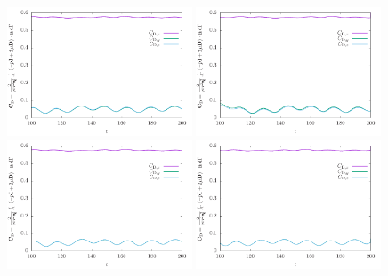 \documentclass[11pt, a4paper]{article}
\theoremstyle{remark}
\begin{document}
\begin{figure}
  \centering
  \includegraphics[width=0.49\textwidth]{./results/flow_past_sphere_smoke/optimized_run_reused_solvers_bcgs_and_pcsor/grid_update_1/force_history.pdf} 
  \includegraphics[width=0.49\textwidth]{./results/flow_past_sphere_smoke/optimized_run_reused_solvers_bcgs_and_pcsor/grid_update_2/force_history.pdf} \\
  \includegraphics[width=0.49\textwidth]{./results/flow_past_sphere_smoke/optimized_run_reused_solvers_bcgs_and_pcsor/grid_update_4/force_history.pdf}
  \includegraphics[width=0.49\textwidth]{./results/flow_past_sphere_smoke/optimized_run_reused_solvers_bcgs_and_pcsor/grid_update_8/force_history.pdf} \\

\end{figure}
\end{document}
